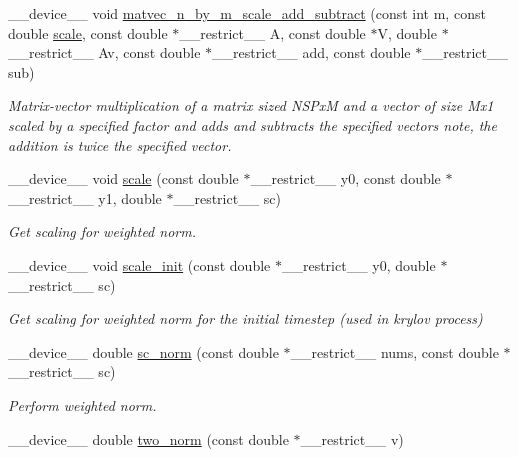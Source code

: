 \begin{DoxyCompactItemize}
\+\_\+\+\_\+device\+\_\+\+\_\+ void \hyperlink{exponential__linear__algebra_8cuh_a0522be133cda40ce325a2af6d95daddb}{matvec\+\_\+n\+\_\+by\+\_\+m\+\_\+scale\+\_\+add\+\_\+subtract} (const int m, const double \hyperlink{inverse_8cu_adbb4f3f3af5f968a94f717729803c88d}{scale}, const double $\ast$\+\_\+\+\_\+restrict\+\_\+\+\_\+ A, const double $\ast$V, double $\ast$\+\_\+\+\_\+restrict\+\_\+\+\_\+ Av, const double $\ast$\+\_\+\+\_\+restrict\+\_\+\+\_\+ add, const double $\ast$\+\_\+\+\_\+restrict\+\_\+\+\_\+ sub)
\begin{DoxyCompactList}\small\item\em Matrix-\/vector multiplication of a matrix sized N\+S\+PxM and a vector of size Mx1 scaled by a specified factor and adds and subtracts the specified vectors note, the addition is twice the specified vector. \end{DoxyCompactList}\item 
\+\_\+\+\_\+device\+\_\+\+\_\+ void \hyperlink{exponential__linear__algebra_8cuh_ace23ed149f65a9b90469b38ecd9ef01b}{scale} (const double $\ast$\+\_\+\+\_\+restrict\+\_\+\+\_\+ y0, const double $\ast$\+\_\+\+\_\+restrict\+\_\+\+\_\+ y1, double $\ast$\+\_\+\+\_\+restrict\+\_\+\+\_\+ sc)
\begin{DoxyCompactList}\small\item\em Get scaling for weighted norm. \end{DoxyCompactList}\item 
\+\_\+\+\_\+device\+\_\+\+\_\+ void \hyperlink{exponential__linear__algebra_8cuh_a2e7ea5b129b2e703fcc6aeb3affadd64}{scale\+\_\+init} (const double $\ast$\+\_\+\+\_\+restrict\+\_\+\+\_\+ y0, double $\ast$\+\_\+\+\_\+restrict\+\_\+\+\_\+ sc)
\begin{DoxyCompactList}\small\item\em Get scaling for weighted norm for the initial timestep (used in krylov process) \end{DoxyCompactList}\item 
\+\_\+\+\_\+device\+\_\+\+\_\+ double \hyperlink{exponential__linear__algebra_8cuh_a0c015672153032287ee1abbde6487d41}{sc\+\_\+norm} (const double $\ast$\+\_\+\+\_\+restrict\+\_\+\+\_\+ nums, const double $\ast$\+\_\+\+\_\+restrict\+\_\+\+\_\+ sc)
\begin{DoxyCompactList}\small\item\em Perform weighted norm. \end{DoxyCompactList}\item 
\+\_\+\+\_\+device\+\_\+\+\_\+ double \hyperlink{exponential__linear__algebra_8cuh_aa0074f06fcc396f12514f858ab825ca8}{two\+\_\+norm} (const double $\ast$\+\_\+\+\_\+restrict\+\_\+\+\_\+ v)

\end{DoxyCompactItemize}
